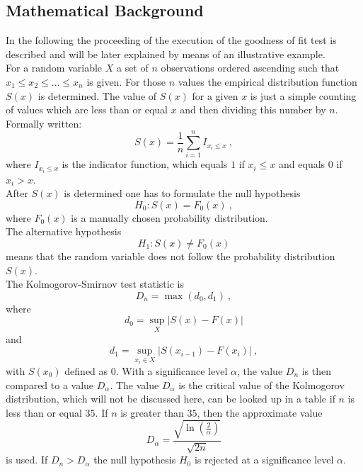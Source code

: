 \documentclass{article}
\begin{document}
\subsection{Mathematical Background}
In the following the proceeding of the execution of the goodness of fit test is described and will be later explained by means of an illustrative example. \\
For a random variable $X$ a set of $n$ observations ordered ascending such that $x_1 \le x_2 \le ... \le x_n$ is given. For those $n$ values the empirical distribution function $S(x)$  is determined.
The value of $S(x)$ for a given $x$ is just a simple counting of values which are less than or equal $x$ and then dividing this number by $n$. Formally written: 
$$S(x) = \frac{1}{n} \sum\limits^n_{i=1} I_{x_i\le x}~,$$
where $I_{x_i\le x}$ is the indicator function, which equals $1$ if $x_i\le x$ and equals $0$ if $x_i>x$.\\
After $S(x)$  is determined one has to formulate the null hypothesis 
$$H_0:S (x)=F_0 (x)~,$$ 
where $F_0 (x)$ is a manually chosen probability distribution.\\
The alternative hypothesis 
$$H_1:S (x)\ne F_0 (x)$$ 
means that the random variable does not follow the probability distribution $S(x)$.\\
The Kolmogorov-Smirnov test statistic is
$$D_n = \max (d_0,d_1)~,$$
where 
$$d_0=\sup_{X} |S(x)-F(x)|$$ 
and
$$d_1 = \sup_{x_i \in X} | S(x_{i-1})-F(x_i)|~,$$
with $S (x_0)$  defined as $0$. With a significance level $\alpha$, the value $D_n$ is then compared to a value $D_\alpha$.
The value $D_\alpha$ is the critical value of the Kolmogorov distribution, which will not be discussed here, can be looked up in a table if $n$ is less than or equal $35$. If $n$ is greater than $35$, then the approximate value
$$D_\alpha = \frac{ \sqrt{\ln(\frac 2 \alpha)} } {\sqrt{2n}}$$ 
is used. If $D_n>D_\alpha$ the null hypothesis $H_0$  is rejected at a significance level $\alpha$.

\end{document}
